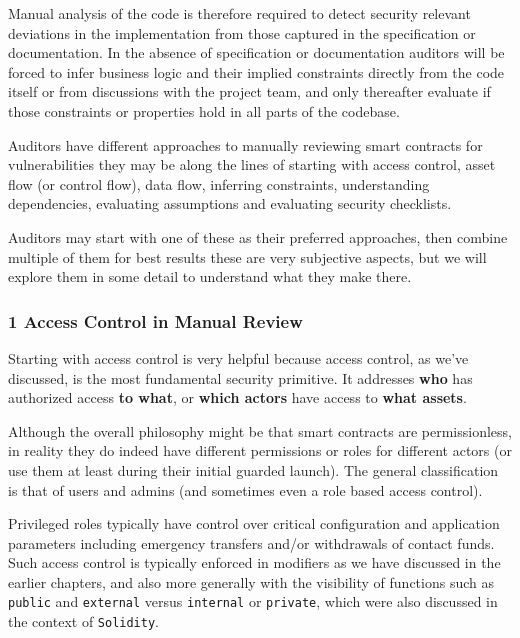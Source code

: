 Manual analysis of the code is therefore required to detect security
relevant deviations in the implementation from those captured in the
specification or documentation. In the absence of specification or
documentation auditors will be forced to infer business logic and their
implied constraints directly from the code itself or from discussions
with the project team, and only thereafter evaluate if those constraints
or properties hold in all parts of the codebase.

Auditors have different approaches to manually reviewing smart contracts
for vulnerabilities they may be along the lines of starting with access
control, asset flow (or control flow), data flow, inferring constraints,
understanding dependencies, evaluating assumptions and evaluating
security checklists.

Auditors may start with one of these as their preferred approaches, then
combine multiple of them for best results these are very subjective
aspects, but we will explore them in some detail to understand what they
make there.

\subsubsection{1 Access Control in Manual
Review}\label{access-control-in-manual-review}

Starting with access control is very helpful because access control, as
we've discussed, is the most fundamental security primitive. It
addresses \textbf{who} has authorized access \textbf{to what}, or
\textbf{which actors} have access to \textbf{what assets}.

Although the overall philosophy might be that smart contracts are
permissionless, in reality they do indeed have different permissions or
roles for different actors (or use them at least during their initial
guarded launch). The general classification is that of users and admins
(and sometimes even a role based access control).

Privileged roles typically have control over critical configuration and
application parameters including emergency transfers and/or withdrawals
of contact funds. Such access control is typically enforced in modifiers
as we have discussed in the earlier chapters, and also more generally
with the visibility of functions such as \texttt{public} and
\texttt{external} versus \texttt{internal} or \texttt{private}, which
were also discussed in the context of \texttt{Solidity}.

